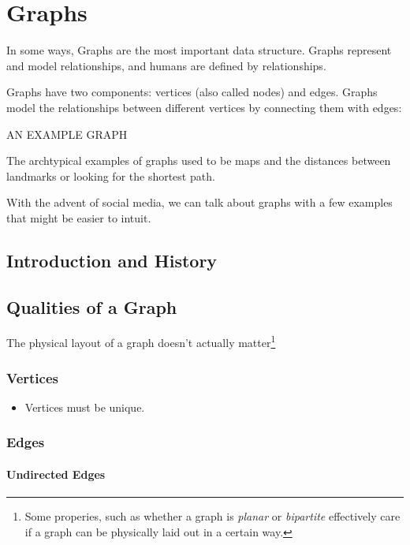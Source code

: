 \chapter{Graphs}
\label{chap-graphs}
In some ways, Graphs are the most important data structure.  
Graphs represent and model relationships, and humans are defined by relationships.


Graphs have two components: vertices (also called nodes) and edges.  Graphs model the relationships between different vertices by connecting them with edges:

AN EXAMPLE GRAPH


The archtypical examples of graphs used to be maps and the distances between landmarks or looking for the shortest path.

With the advent of social media, we can talk about graphs with a few examples that might be easier to intuit.




\section{Introduction and History}


\section{Qualities of a Graph}

The physical layout of a graph doesn't actually matter\footnote{Some properies, such as whether a graph is \emph{planar} or \emph{bipartite} effectively care if a graph can be physically laid out in a certain way.}

\subsection{Vertices}

\begin{itemize}
	\item Vertices must be unique.
\end{itemize}

\subsection{Edges}

\subsubsection{Undirected Edges}

